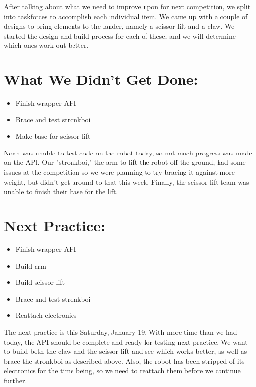 \documentclass[12pt]{article}
\begin{document}
After talking about what we need to improve upon for next competition, we split into taskforces to accomplish each individual item. We came up with a couple of designs to bring elements to the lander, namely a scissor lift and a claw. We started the design and build process for each of these, and we will determine which ones work out better.

\section{What We Didn't Get Done:} %
\begin{itemize}
	\item Finish wrapper API
	\item Brace and test stronkboi
	\item Make base for scissor lift
\end{itemize}

Noah was unable to test code on the robot today, so not much progress was made on the API. Our "stronkboi," the arm to lift the robot off the ground, had some issues at the competition so we were planning to try bracing it against more weight, but didn't get around to that this week. Finally, the scissor lift team was unable to finish their base for the lift.

\section{Next Practice:}
\begin{itemize}
	\item Finish wrapper API
	\item Build arm
	\item Build scissor lift
	\item Brace and test stronkboi
	\item Reattach electronics
\end{itemize}

The next practice is this Saturday, January 19. %
With more time than we had today, the API should be complete and ready for testing next practice. We want to build both the claw and the scissor lift and see which works better, as well as brace the stronkboi as described above. Also, the robot has been stripped of its electronics for the time being, so we need to reattach them before we continue further.
\end{document}

